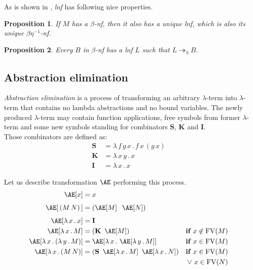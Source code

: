 \documentclass{sig-alternate}
\newtheorem{proposition}{Proposition}
\newcommand{\Lets}{Let us\xspace}
\newcommand{\lterm}{$\lambda$-term\xspace}
\newcommand{\lamb}[2]{( \lambda \, #1 \, . \, #2 )}
\newcommand{\lam}[2]{\lambda \, #1 \, . \, #2}
\newcommand{\FV}{\mathop{\mathrm{FV}}}
\newcommand{\Scomb }{\mathbf{S}}
\newcommand{\Kcomb }{\mathbf{K}}
\newcommand{\Icomb }{\mathbf{I}}
\newcommand{\bnf}{$\beta$-\textit{nf}\xspace}
\newcommand{\beenf}{$\beta\eta^{-1}$-\textit{nf}\xspace}
\newcommand{\lnf}{\textit{lnf}\xspace}
\newcommand{\Ae}{\mathop{\mathrm{\AE}}}
\begin{document}
As is shown in \cite{barendregt10}, \lnf has following nice properties.

\begin{proposition}
If $M$ has a \bnf, 
then it also has a unique \lnf, 
which is also its unique \beenf.
\end{proposition}

\begin{proposition}
Every $B$ in \bnf has a \lnf 
$L$ such that $L \twoheadrightarrow_{\eta} B$.
\end{proposition}

\subsection{Abstraction elimination}

\textit{Abstraction elimination} is a process of transforming 
an arbitrary \lterm into \lterm that contains no lambda abstractions
and no bound variables.
The newly produced \lterm may contain function applications, 
free symbols from former \lterm and some new symbols standing for 
combinators $\Scomb$, $\Kcomb$ and $\Icomb$. \\

Those combinators are defined as:
\begin{align*}
\Scomb &= \lam{f\,g\,x}{f\,x\,(g\,x)} \\
\Kcomb &= \lam{x\,y}{x} \\
\Icomb &= \lam{x}{x} 
\end{align*}


\Lets describe transformation $\Ae$ performing this 
process.
\begin{align*}
\Ae[x]           &= x &\\[0.4em]
\Ae[\,(M\,N)\,]  &= (\Ae[M]\;\;\Ae[N]) &\\[0.4em]
\Ae[\lam{x}{x}]  &= \Icomb &\\
\Ae[\lam{x}{M}]  &= (\Kcomb~\Ae[M]) &\textbf{if } x \not\in \FV(M)\\
\Ae[\lam{x}{\lamb{y}{M}}] &= \Ae[\lam{x}{\Ae[\lam{y}{M}]}]  
&\textbf{if } x \in \FV(M)\\
\Ae[\lam{x}{(M\,N)}] &= (\Scomb~\Ae[\lam{x}{M}]~\Ae[\lam{x}{N}])  
&\textbf{if } x \in \FV(M)\\
&&\vee~ x \in \FV(N)\\
\end{align*}
\end{document}
